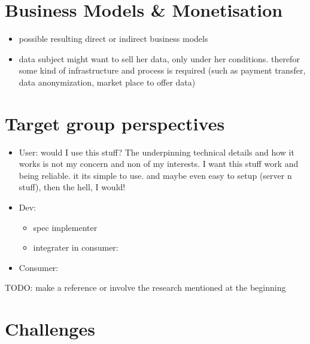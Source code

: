 \documentclass[12pt,english,a4paper,titlepage,cleardoublepage=empty,dottedtoc]{report}
\providecommand{\tightlist}{%
  \setlength{\itemsep}{0pt}\setlength{\parskip}{0pt}}
\begin{document}
\section{Business Models \&
Monetisation}\label{business-models-monetisation}

\begin{itemize}
\tightlist
\item
  possible resulting direct or indirect business models
\item
  data subject might want to sell her data, only under her conditions.
  therefor some kind of infrastructure and process is required (such as
  payment transfer, data anonymization, market place to offer data)
\end{itemize}

\section{Target group perspectives}\label{target-group-perspectives}

\begin{itemize}
\tightlist
\item
  User: would I use this stuff? The underpinning technical details and
  how it works is not my concern and non of my interests. I want this
  stuff work and being reliable. it its simple to use. and maybe even
  easy to setup (server n stuff), then the hell, I would!
\item
  Dev:

  \begin{itemize}
  \tightlist
  \item
    spec implementer
  \item
    integrater in consumer:
  \end{itemize}
\item
  Consumer:
\end{itemize}

TODO: make a reference or involve the research mentioned at the
beginning

\section{Challenges}\label{challenges}
\end{document}
